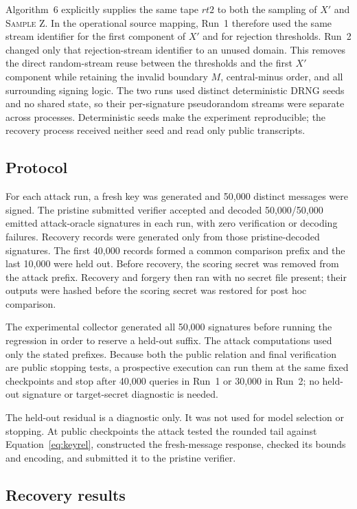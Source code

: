 \documentclass[11pt,a4paper]{article}
\begin{document}
Algorithm~6 explicitly supplies the same tape $\mathit{rt2}$ to both the
sampling of $X'$ and \textsc{Sample Z}.  In the operational source mapping,
Run~1 therefore used the same stream identifier for the first component of
$X'$ and for rejection thresholds.  Run~2 changed only that rejection-stream
identifier to an unused domain.  This removes the direct random-stream reuse
between the thresholds and the first $X'$ component while retaining the
invalid boundary $M$, central-minus order, and all surrounding signing logic.
The two runs used distinct deterministic DRNG seeds and no shared state, so
their per-signature pseudorandom streams were separate across processes.
Deterministic seeds make the experiment
reproducible; the recovery process received neither seed and read only public
transcripts.

\subsection{Protocol}

For each attack run, a fresh key was generated and 50,000 distinct messages
were signed.  The pristine submitted verifier accepted and decoded
50,000/50,000 emitted attack-oracle signatures in each run, with zero
verification or decoding failures.  Recovery records were generated only from
those pristine-decoded signatures.  The first 40,000 records formed a common
comparison prefix and the last 10,000 were held out.  Before recovery, the
scoring secret was removed from the attack prefix.  Recovery and forgery then
ran with no secret file present; their outputs were hashed before the scoring
secret was restored for post hoc comparison.

The experimental collector generated all 50,000 signatures before running
the regression in order to reserve a held-out suffix.  The attack computations
used only the stated prefixes.  Because both the public relation and final
verification are public stopping tests, a prospective execution can run them
at the same fixed checkpoints and stop after 40,000 queries in Run~1 or
30,000 in Run~2; no held-out signature or target-secret diagnostic is needed.

The held-out residual is a diagnostic only.  It was not used for model
selection or stopping.  At public checkpoints the attack tested the rounded
tail against Equation~\eqref{eq:keyrel}, constructed the fresh-message
response, checked its bounds and encoding, and submitted it to the pristine
verifier.

\subsection{Recovery results}
\end{document}
